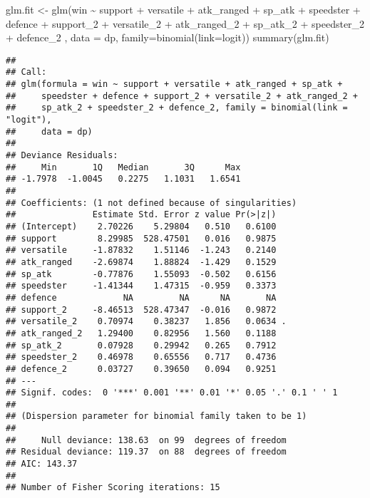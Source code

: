 \documentclass[
]{article}
\newenvironment{Shaded}{\begin{snugshade}}{\end{snugshade}}
\newcommand{\AttributeTok}[1]{\textcolor[rgb]{0.77,0.63,0.00}{#1}}
\newcommand{\FunctionTok}[1]{\textcolor[rgb]{0.00,0.00,0.00}{#1}}
\newcommand{\NormalTok}[1]{#1}
\newcommand{\OtherTok}[1]{\textcolor[rgb]{0.56,0.35,0.01}{#1}}
\newcommand{\SpecialCharTok}[1]{\textcolor[rgb]{0.00,0.00,0.00}{#1}}
\newcommand{\StringTok}[1]{\textcolor[rgb]{0.31,0.60,0.02}{#1}}
\begin{document}
\begin{Shaded}
\begin{Highlighting}[]
\NormalTok{glm.fit }\OtherTok{\textless{}{-}} \FunctionTok{glm}\NormalTok{(win }\SpecialCharTok{\textasciitilde{}}\NormalTok{ support }\SpecialCharTok{+}\NormalTok{ versatile }\SpecialCharTok{+}\NormalTok{ atk\_ranged }\SpecialCharTok{+}\NormalTok{ sp\_atk }\SpecialCharTok{+}\NormalTok{ speedster }\SpecialCharTok{+}\NormalTok{ defence}
                \SpecialCharTok{+}\NormalTok{ support\_2 }\SpecialCharTok{+}\NormalTok{ versatile\_2 }\SpecialCharTok{+}\NormalTok{ atk\_ranged\_2 }\SpecialCharTok{+}\NormalTok{ sp\_atk\_2 }\SpecialCharTok{+}\NormalTok{ speedster\_2 }\SpecialCharTok{+}\NormalTok{ defence\_2}
\NormalTok{               , }\AttributeTok{data =}\NormalTok{ dp, }\AttributeTok{family=}\FunctionTok{binomial}\NormalTok{(}\AttributeTok{link=}\StringTok{\textquotesingle{}logit\textquotesingle{}}\NormalTok{))}
\FunctionTok{summary}\NormalTok{(glm.fit)}
\end{Highlighting}
\end{Shaded}

\begin{verbatim}
## 
## Call:
## glm(formula = win ~ support + versatile + atk_ranged + sp_atk + 
##     speedster + defence + support_2 + versatile_2 + atk_ranged_2 + 
##     sp_atk_2 + speedster_2 + defence_2, family = binomial(link = "logit"), 
##     data = dp)
## 
## Deviance Residuals: 
##     Min       1Q   Median       3Q      Max  
## -1.7978  -1.0045   0.2275   1.1031   1.6541  
## 
## Coefficients: (1 not defined because of singularities)
##               Estimate Std. Error z value Pr(>|z|)  
## (Intercept)    2.70226    5.29804   0.510   0.6100  
## support        8.29985  528.47501   0.016   0.9875  
## versatile     -1.87832    1.51146  -1.243   0.2140  
## atk_ranged    -2.69874    1.88824  -1.429   0.1529  
## sp_atk        -0.77876    1.55093  -0.502   0.6156  
## speedster     -1.41344    1.47315  -0.959   0.3373  
## defence             NA         NA      NA       NA  
## support_2     -8.46513  528.47347  -0.016   0.9872  
## versatile_2    0.70974    0.38237   1.856   0.0634 .
## atk_ranged_2   1.29400    0.82956   1.560   0.1188  
## sp_atk_2       0.07928    0.29942   0.265   0.7912  
## speedster_2    0.46978    0.65556   0.717   0.4736  
## defence_2      0.03727    0.39650   0.094   0.9251  
## ---
## Signif. codes:  0 '***' 0.001 '**' 0.01 '*' 0.05 '.' 0.1 ' ' 1
## 
## (Dispersion parameter for binomial family taken to be 1)
## 
##     Null deviance: 138.63  on 99  degrees of freedom
## Residual deviance: 119.37  on 88  degrees of freedom
## AIC: 143.37
## 
## Number of Fisher Scoring iterations: 15
\end{verbatim}
\end{document}
